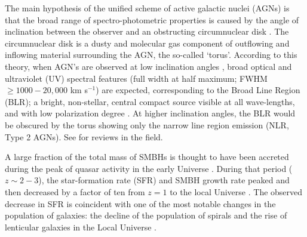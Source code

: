 \documentclass[modern]{CORE-AAS/aastex631}
\begin{document}
{The main hypothesis of the unified scheme of active galactic nuclei (AGNs) is that the broad range of spectro-photometric properties is caused by the angle of inclination between the observer and an obstructing circumnuclear disk \citep{antonucci1993araa31_473, urry+1995pasp107_803}. The circumnuclear disk is a dusty and molecular gas component of outflowing and inflowing material surrounding the AGN, the so-called `torus'. According to this theory, when AGN's are observed at low inclination angles \citep[$i<45$--$60^{\circ}$, where $i=0^{\circ}$ would be face-on,][]{marin2014mnras441_551}, broad optical and ultraviolet (UV) spectral features (full width at half maximum; FWHM $\geq 1000-20,000$ km s$^{-1}$) are expected, corresponding to the Broad Line Region (BLR); a bright, non-stellar, central compact source visible at all wave-lengths, and with low polarization degree \citep[Type 1 AGNs,][]{netzer2015araa53_365}. At higher inclination angles, the BLR would be obscured by the torus showing only the narrow line region emission (NLR, Type 2 AGNs). See \citet{peterson2006incollection_77, netzer2015araa53_365, ramosalmeida+2017nat1_679} for reviews in the field.


A large fraction of the total mass of SMBHs is thought to have been accreted during the peak of quasar activity in the early Universe \citep[$z=2-3$,][]{boyle+1998mnras293_49, delvecchio+2014mnras439_2736, madau+2014araa52_415}. During that period ($z\sim2-3$), the star-formation rate (SFR) and SMBH growth rate peaked and then decreased by a factor of ten from $z=1$ to the local Universe \citep{shankar+2009apj690_20}. The observed decrease in SFR is coincident with one of the most notable changes in the population of galaxies: the decline of the population of spirals and the rise of lenticular galaxies in the Local Universe \citep{dressler+1997apj490_577}.


}
\end{document}
